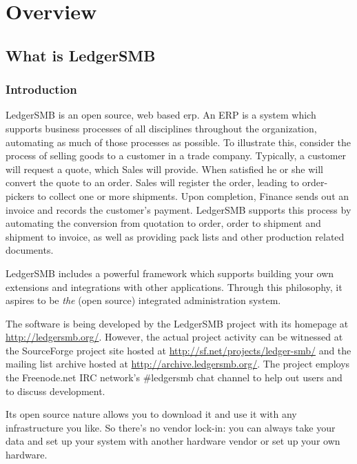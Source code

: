 
\part{Overview}
\label{part-overview}


\chapter{What is LedgerSMB}
\label{cha-what-is-ledgersmb}

\section{Introduction}
\label{sec-ledgersmb-introduction}
LedgerSMB is an open source, web based \gls{erp}. An ERP is a system
which supports business processes of all disciplines throughout the
organization, automating as much of those processes as possible. To
illustrate this, consider the process of selling goods to a customer
in a trade company. Typically, a customer will request a quote, which
Sales will provide. When satisfied he or she will convert the quote 
to an order. Sales will register the order, leading to order-pickers
to collect one or more shipments. Upon completion, Finance sends
out an invoice and records the customer's payment. LedgerSMB supports
this process by automating the conversion from quotation to order,
order to shipment and shipment to invoice, as well as providing
pack lists and other production related documents.

LedgerSMB includes a
powerful framework which supports building your own extensions and
integrations with other applications. Through this philosophy, it
aspires to be \emph{the} (open source) integrated administration system.

The software is being developed by the LedgerSMB project with its homepage at \url{http://ledgersmb.org/}.
However, the actual project activity can be witnessed at the SourceForge
project site hosted at \url{http://sf.net/projects/ledger-smb/} and the mailing list archive
hosted at \url{http://archive.ledgersmb.org/}.  The project
employs the Freenode.net IRC network's \#ledgersmb chat channel to help out users and to discuss
development.

Its open source nature allows you to download it and use it with any
infrastructure you like. So there's no vendor lock-in: you can
always take your data and set up your system with another hardware vendor
or set up your own hardware.

